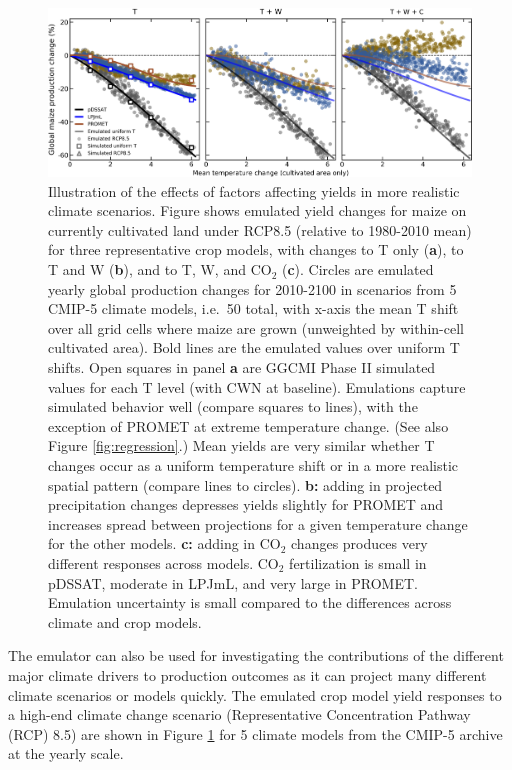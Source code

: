 \documentclass[gmd, manuscript]{copernicus} %
\begin{document}
\begin{figure}[ht]
    \centering
    \includegraphics[width = 16.3cm]{figures/global_em_maize.png}
    \caption{
    Illustration of the effects of factors affecting yields in more realistic climate scenarios. 
    Figure shows emulated yield changes for maize on currently cultivated land under RCP8.5 (relative to 1980-2010 mean) for three representative crop models, with changes to T only (\textbf{a}), to T and W (\textbf{b}), and to T, W, and CO$_2$ (\textbf{c}).
    Circles are emulated yearly global production changes for 2010-2100 in scenarios from 5 CMIP-5 climate models, i.e.\ 50 total, with x-axis the mean T shift over all grid cells where maize are grown (unweighted by within-cell cultivated area). %
    Bold lines are the emulated values over uniform T shifts. 
    Open squares in panel \textbf{a} are GGCMI Phase II simulated values for each T level (with CWN at baseline).  
    Emulations capture simulated behavior well (compare squares to lines), with the exception of PROMET at extreme temperature change. (See also Figure \ref{fig:regression}.)
    Mean yields are very similar whether T changes occur as a uniform temperature shift or in a more realistic spatial pattern (compare lines to circles). 
    \textbf{b:} adding in projected precipitation changes depresses yields slightly for PROMET and increases spread between projections for a given temperature change for the other models. 
    \textbf{c:} adding in CO$_2$ changes produces very different responses across models. 
    CO$_2$ fertilization is small in pDSSAT, moderate in LPJmL, and very large in PROMET. 
    Emulation uncertainty is small compared to the differences across climate and crop models.
    }
    \label{fig:globe_em}
\end{figure}

The emulator can also be used for investigating the contributions of the different major climate drivers to production outcomes as it can project many different climate scenarios or models quickly.
The emulated crop model yield responses to a high-end climate change scenario (Representative Concentration Pathway (RCP) 8.5) are shown in Figure \ref{fig:globe_em} for 5 climate models from the CMIP-5 archive \citep{Taylor2012} at the yearly scale. 
\end{document}
